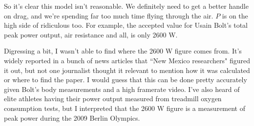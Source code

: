 \documentclass[12pt]{article}
\begin{document}
So it's clear this model isn't reasonable. We definitely need to get a better handle on drag, and we're spending far too much time flying through the air. \(P\) is on the high side of ridiculous too. For example, the accepted value for Usain Bolt's total peak power output, air resistance and all, is only 2600 W.

Digressing a bit, I wasn't able to find where the 2600 W figure comes from. It's widely reported in a bunch of news articles that ``New Mexico researchers" figured it out, but not one journalist thought it relevant to mention how it was calculated or where to find the paper. I would guess that this can be done pretty accurately given Bolt's body measurements and a high framerate video. I've also heard of elite athletes having their power output measured from treadmill oxygen consumption tests, but I interpreted that the 2600 W figure is a measurement of peak power during the 2009 Berlin Olympics.
\end{document}
